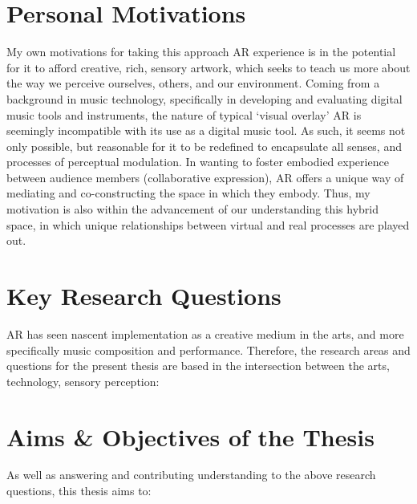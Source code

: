 \section{Personal Motivations}\label{sec: introduction-motivations}
My own motivations for taking this approach AR experience is in the potential for it to afford creative, rich, sensory artwork, which seeks to teach us more about the way we perceive ourselves, others, and our environment. Coming from a background in music technology, specifically in developing and evaluating digital music tools and instruments, the nature of typical `visual overlay' AR is seemingly incompatible with its use as a digital music tool. As such, it seems not only possible, but reasonable for it to be redefined to encapsulate all senses, and processes of perceptual modulation. In wanting to foster embodied experience between audience members (collaborative expression), AR offers a unique way of mediating and co-constructing the space in which they embody. Thus, my motivation is also within the advancement of our understanding this hybrid space, in which unique relationships between virtual and real processes are played out.



\section{Key Research Questions}\label{sec: introduction-researchquestions}
AR has seen nascent implementation as a creative medium in the arts, and more specifically music composition and performance. Therefore, the research areas and questions for the present thesis are based in the intersection between the arts, technology, sensory perception:

\RQall

\section{Aims \& Objectives of the Thesis}\label{sec: introduction-aims}
As well as answering and contributing understanding to the above research questions, this thesis aims to:


